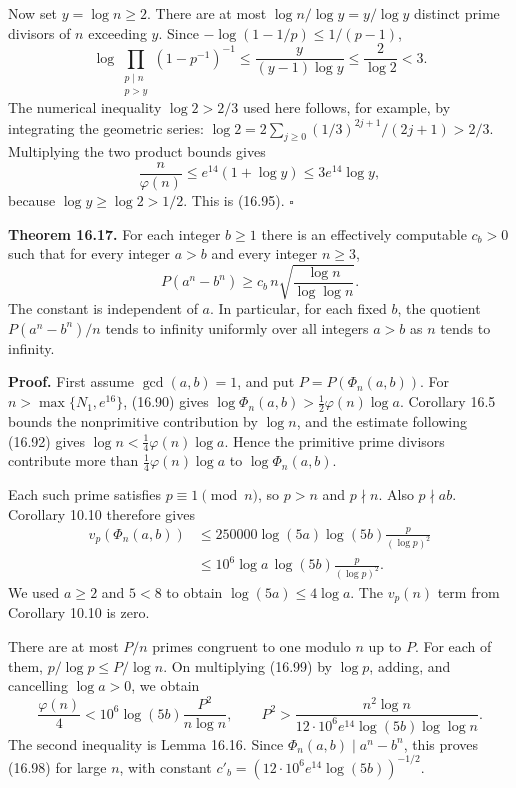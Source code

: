 \documentclass[
  11pt,
  a4paper,
]{article}
\begin{document}
Now set \(y=\log n\ge2\). There are at most \(\log n/\log y=y/\log y\)
distinct prime divisors of \(n\) exceeding \(y\). Since
\(-\log(1-1/p)\le1/(p-1)\), \[
 \log\prod_{\substack{p\mid n\\p>y}}(1-p^{-1})^{-1}
 \le\frac{y}{(y-1)\log y}
 \le\frac2{\log2}<3.
 \tag{16.97}
\] The numerical inequality \(\log2>2/3\) used here follows, for
example, by integrating the geometric series:
\(\log2=2\sum_{j\ge0}(1/3)^{2j+1}/(2j+1)>2/3\). Multiplying the two
product bounds gives \[
 \frac n{\varphi(n)}
 \le e^{14}(1+\log y)\le3e^{14}\log y,
\] because \(\log y\ge\log2>1/2\). This is (16.95). \(\square\)

\textbf{Theorem 16.17.} For each integer \(b\ge1\) there is an
effectively computable \(c_b>0\) such that for every integer \(a>b\) and
every integer \(n\ge3\), \[
 P(a^n-b^n)\ge
 c_b\,n\sqrt{\frac{\log n}{\log\log n}}.
 \tag{16.98}
\] The constant is independent of \(a\). In particular, for each fixed
\(b\), the quotient \(P(a^n-b^n)/n\) tends to infinity uniformly over
all integers \(a>b\) as \(n\) tends to infinity.

\textbf{Proof.} First assume \(\gcd(a,b)=1\), and put
\(P=P(\Phi_n(a,b))\). For \(n>\max\{N_1,e^{16}\}\), (16.90) gives
\(\log\Phi_n(a,b)>\tfrac12\varphi(n)\log a\). Corollary 16.5 bounds the
nonprimitive contribution by \(\log n\), and the estimate following
(16.92) gives \(\log n<\tfrac14\varphi(n)\log a\). Hence the primitive
prime divisors contribute more than \(\tfrac14\varphi(n)\log a\) to
\(\log\Phi_n(a,b)\).

Each such prime satisfies \(p\equiv1\pmod n\), so \(p>n\) and
\(p\nmid n\). Also \(p\nmid ab\). Corollary 10.10 therefore gives \[
 \begin{split}
 v_p(\Phi_n(a,b))
 &\le250000\log(5a)\log(5b)\frac{p}{(\log p)^2}\\
 &\le10^6\log a\,\log(5b)\frac{p}{(\log p)^2}.
 \end{split}
 \tag{16.99}
\] We used \(a\ge2\) and \(5<8\) to obtain \(\log(5a)\le4\log a\). The
\(v_p(n)\) term from Corollary 10.10 is zero.

There are at most \(P/n\) primes congruent to one modulo \(n\) up to
\(P\). For each of them, \(p/\log p\le P/\log n\). On multiplying
(16.99) by \(\log p\), adding, and cancelling \(\log a>0\), we obtain \[
 \frac{\varphi(n)}4<
 10^6\log(5b)\frac{P^2}{n\log n},\qquad
 P^2>
 \frac{n^2\log n}
 {12\cdot10^6 e^{14}\log(5b)\log\log n}.
 \tag{16.100}
\] The second inequality is Lemma 16.16. Since
\(\Phi_n(a,b)\mid a^n-b^n\), this proves (16.98) for large \(n\), with
constant \(c'_b=(12\cdot10^6e^{14}\log(5b))^{-1/2}\).
\end{document}
